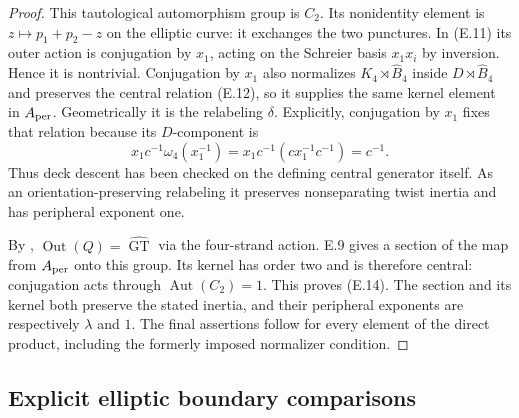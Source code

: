 \begin{proof}
This tautological automorphism group is $C_2$.  Its nonidentity
element is $z\mapsto p_1+p_2-z$ on the elliptic curve: it exchanges
the two punctures.  In (E.11) its outer action is conjugation by
$x_1$, acting on the Schreier basis $x_1x_i$ by inversion.  Hence
it is nontrivial.  Conjugation by $x_1$ also normalizes
$K_4\rtimes\widehat B_4$ inside $D\rtimes\widehat B_4$ and
preserves the central relation (E.12), so it supplies the same
kernel element in $A_{\rm per}$.  Geometrically it is the
relabeling $\delta$.  Explicitly, conjugation by $x_1$ fixes that
relation because its $D$-component is
\[
 x_1c^{-1}\omega_4(x_1^{-1})
   =x_1c^{-1}(cx_1^{-1}c^{-1})=c^{-1}.
\]
Thus deck descent has been checked on the defining central
generator itself.  As an orientation-preserving
relabeling it
preserves nonseparating twist inertia and has peripheral exponent
one.

By \cite[Theorem 4.3(i), Corollary C]{ET_MN2022},
$\operatorname{Out}(Q)=\widehat{\operatorname{GT}}$ via the
four-strand action.  E.9 gives a section of the map from
$A_{\rm per}$ onto this group.  Its kernel has order two and is
therefore central: conjugation acts through
$\operatorname{Aut}(C_2)=1$.  This proves (E.14).
The section and its kernel both preserve the stated inertia,
and their peripheral exponents are respectively $\lambda$ and
$1$.  The final assertions follow for every element of the direct
product, including the formerly imposed normalizer condition.
\end{proof}

\subsection{Explicit elliptic boundary comparisons}

